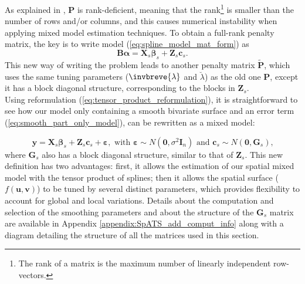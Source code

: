 As explained in \textcite{rodriguez-alvarez_spatial_2016}, $\mathbf{P}$ is rank-deficient, meaning that the rank\footnote{The rank of a matrix is the maximum number of linearly independent row-vectors.} is smaller than the 
number of rows and/or columns, and this causes numerical instability when applying mixed model estimation techniques. To obtain 
a full-rank penalty matrix, the key is to write model (\ref{eq:spline_model_mat_form}) as 
\begin{equation}
    \mathbf{B}\boldsymbol{\alpha} = \boldsymbol{X}_{s} \boldsymbol{\beta}_{s}+\boldsymbol{Z}_{s} \boldsymbol{c}_{s}
    \text{.}
    \label{eq:tensor_product_reformulation}
\end{equation}
This new way of writing the problem leads to another penalty matrix $ \widetilde{\boldsymbol{P}}$, which uses the same tuning parameters ($\invbreve{\lambda}$ and $\breve{\lambda}$) as the old one $\mathbf{P}$, except it has a block diagonal structure, corresponding to the blocks in $\mathbf{Z}_{s}$.\\

Using reformulation (\ref{eq:tensor_product_reformulation}), it is straightforward to see how our model only containing a smooth bivariate surface and an error term (\ref{eq:smooth_part_only_model}), can be rewritten as a mixed model:

\begin{equation}
    \boldsymbol{y}=\boldsymbol{X}_{s} \boldsymbol{\beta}_{s}+\boldsymbol{Z}_{s} \boldsymbol{c}_{s}+\boldsymbol{\varepsilon}, 	
    \text { with } 
    \boldsymbol{\varepsilon} \sim N\left(\mathbf{0}, \sigma^{2} \boldsymbol{I}_{n}\right) 
    \text { and } 
    \boldsymbol{c}_{s} \sim N\left(\mathbf{0}, \boldsymbol{G}_{s}\right)
    \text{,}
\label{eq:smooth_surface_PS_ANOVA_rewritten}
\end{equation}
where $\boldsymbol{G}_{s}$ also has a block diagonal structure, similar to that of $\mathbf{Z}_{s}$. This new definition has two advantages: first, it allows the estimation of our spatial mixed model with the tensor product of splines; then it allows the spatial surface ($f(\boldsymbol{u},\boldsymbol{v})$) to be tuned by several distinct parameters, which provides flexibility to account for global and local variations. Details about the computation and selection of the smoothing parameters and about the structure of the $\boldsymbol{G}_{s}$ matrix are available in Appendix \ref{appendix:SpATS_add_comput_info} along with a diagram detailing the structure of all the matrices used in this section.

